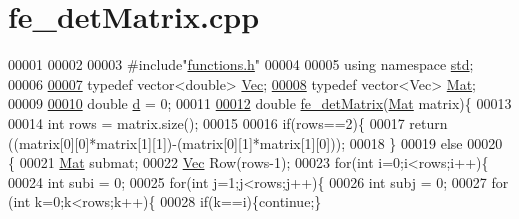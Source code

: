 \hypertarget{fe__det_matrix_8cpp_source}{}\section{fe\+\_\+det\+Matrix.\+cpp}
\label{fe__det_matrix_8cpp_source}

\begin{DoxyCode}
00001 
00002 
00003 \textcolor{preprocessor}{#include"\hyperlink{functions_8h}{functions.h}"}
00004 
00005 \textcolor{keyword}{using namespace }\hyperlink{namespacestd}{std};
00006 
\hyperlink{fe__det_matrix_8cpp_ad4d11f46a1909b55cc804ca942ce6ea4}{00007} \textcolor{keyword}{typedef} vector<double> \hyperlink{fe__det_matrix_8cpp_ad4d11f46a1909b55cc804ca942ce6ea4}{Vec};
\hyperlink{fe__det_matrix_8cpp_a1356201aa606214a43dbef76118a8c20}{00008} \textcolor{keyword}{typedef} vector<Vec> \hyperlink{fe__det_matrix_8cpp_a1356201aa606214a43dbef76118a8c20}{Mat};
00009 
\hyperlink{fe__det_matrix_8cpp_a873684cefeb665f3d5e6b495de57fc0d}{00010} \textcolor{keywordtype}{double} \hyperlink{fe__det_matrix_8cpp_a873684cefeb665f3d5e6b495de57fc0d}{d} = 0;
00011 
\hyperlink{fe__det_matrix_8cpp_a715b940baf396c94255779d0573d9957}{00012} \textcolor{keywordtype}{double} \hyperlink{fe__det_matrix_8cpp_a715b940baf396c94255779d0573d9957}{fe\_detMatrix}(\hyperlink{fe__det_matrix_8cpp_a1356201aa606214a43dbef76118a8c20}{Mat} matrix)\{
00013 
00014     \textcolor{keywordtype}{int} rows = matrix.size();
00015 
00016     \textcolor{keywordflow}{if}(rows==2)\{
00017         \textcolor{keywordflow}{return} ((matrix[0][0]*matrix[1][1])-(matrix[0][1]*matrix[1][0]));
00018     \}
00019     \textcolor{keywordflow}{else}
00020     \{
00021         \hyperlink{fe__det_matrix_8cpp_a1356201aa606214a43dbef76118a8c20}{Mat} submat;
00022         \hyperlink{fe__det_matrix_8cpp_ad4d11f46a1909b55cc804ca942ce6ea4}{Vec} Row(rows-1);
00023         \textcolor{keywordflow}{for}(\textcolor{keywordtype}{int} i=0;i<rows;i++)\{
00024             \textcolor{keywordtype}{int} subi = 0;
00025             \textcolor{keywordflow}{for}(\textcolor{keywordtype}{int} j=1;j<rows;j++)\{
00026                 \textcolor{keywordtype}{int} subj = 0;
00027                 \textcolor{keywordflow}{for} (\textcolor{keywordtype}{int} k=0;k<rows;k++)\{
00028                     \textcolor{keywordflow}{if}(k==i)\{\textcolor{keywordflow}{continue};\}

\end{DoxyCode}
